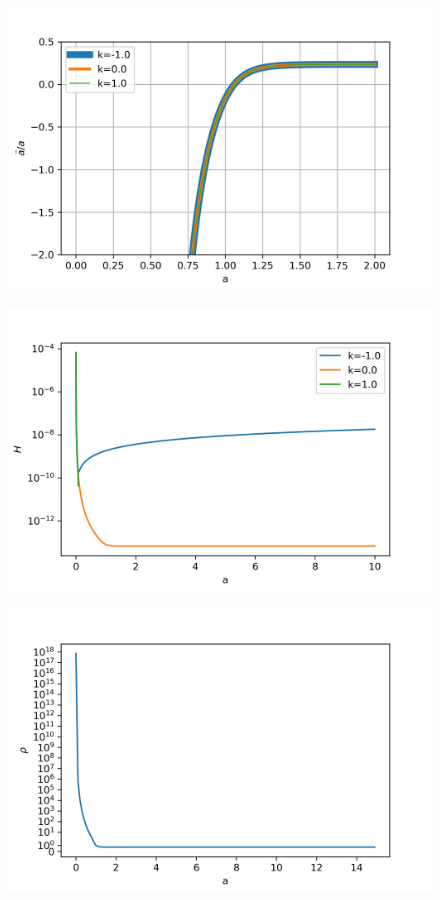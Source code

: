 \documentclass[a4paper, 11pt]{FSKH_623_Report}
\numberwithin{equation}{section}
\begin{document}
\begin{figure}[H]
\centering
\includegraphics[scale=1]{Figures/ch_ddota.jpg}
\caption{}
\end{figure}

\begin{figure}[H]
\centering
\includegraphics[scale=1]{Figures/ch_H.jpg}
\caption{}
\end{figure}

\begin{figure}[H]
\centering
\includegraphics[scale=1]{Figures/ch_rho.jpg}
\caption{}
\end{figure}
\end{document}
